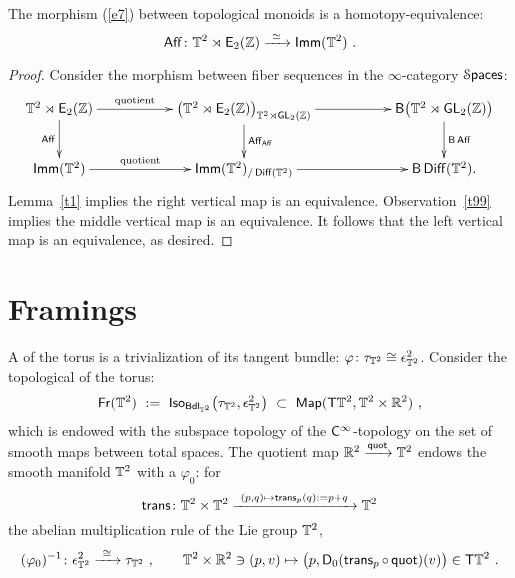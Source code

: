 \begin{cor}
\label{t22}
The morphism (\ref{e7}) between topological monoids is a homotopy-equivalence:
\[
\operatorname{\sf Aff}
\colon
\mathbb T^2 \rtimes \operatorname{\mathsf E_2(\mathbb Z)}
\xrightarrow{~\simeq~}
\operatorname{\sf Imm}(\mathbb T^2)
~.
\]

\end{cor}

\begin{proof}

Consider the morphism between fiber sequences in the $\infty$-category $\operatorname{\mathcal S\mathsf{paces}}$:
\[
\xymatrix{
 \TT^2 \rtimes\EZ
\ar[rr]^-{\rm quotient}
\ar[d]_-{\Aff}
&&
\bigl(
\TT^2 \rtimes \EZ
\bigr)_{\TT^2 \rtimes \GL_2(\ZZ)}
\ar[rr]
\ar[d]^-{\Aff_{\Aff}}
&&
\sB\bigl( \TT^2 \rtimes \GL_2(\ZZ) \bigr)
\ar[d]^-{\sB \Aff}
\\
\Imm(\TT^2)
\ar[rr]^-{\rm quotient}
&&
\Imm(\TT^2)_{/\Diff(\TT^2)}
\ar[rr]
&&
\sB \Diff(\TT^2)
.
}
\]
Lemma~\ref{t1} implies the right vertical map is an equivalence.
Observation~\ref{t99} implies the middle vertical map is an equivalence.
It follows that the left vertical map is an equivalence, as desired.



\end{proof}








\section{Framings}



A  of the torus is a trivialization of its tangent bundle: $\varphi\colon  \tau_{\mathbb T^2} \cong  \epsilon^2_{\mathbb T^2}$.
Consider the topological  of the torus:
\[
\operatorname{\sf Fr}(\mathbb T^2)
~:=~
\operatorname{\sf Iso}_{\operatorname{\sf Bdl}_{\mathbb T^2}}\bigl( \tau_{\mathbb T^2} , \epsilon^2_{\mathbb T^2}  \bigr)
~\subset~
\operatorname{{\sf Map}}(  \mathsf T \mathbb T^2  , \mathbb T^2 \times \mathbb R^2 )
~,
\]
which is endowed with the subspace topology of the $\mathsf C^\infty$-topology on the set of smooth maps between total spaces.  
The quotient map $\mathbb R^2\xrightarrow{\operatorname{\sf quot}}\mathbb T^2$ endows the smooth manifold $\mathbb T^2$ with a  $\varphi_0$:
for 
\[
\operatorname{\sf trans}\colon \mathbb T^2 \times \mathbb T^2 
\xrightarrow{~(p,q)\mapsto \operatorname{\sf trans}_p(q) := p+q~} 
\mathbb T^2
\]
the abelian multiplication rule of the Lie group $\mathbb T^2$, 
\[
(\varphi_0)^{-1}
\colon
\epsilon^2_{\mathbb T^2}
\xrightarrow{~\cong~}
\tau_{\mathbb T^2}
~,\qquad
\mathbb T^2 \times \mathbb R^2 \ni (p,v)
\mapsto
\bigl(p,\mathsf D_{0}(\operatorname{\sf trans}_p \circ \operatorname{\sf quot}) (v) \bigr)
\in \mathsf T \mathbb T^2
~.
\]




